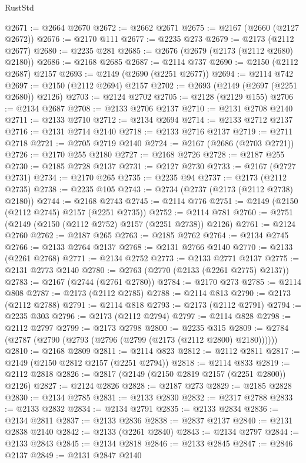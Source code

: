 \begin{lexlean}{RustStd}
\begin{coremodule}
{\begin{coremodule}
{{{{{{{{{{{{{{{{@2671 := @2664 @2670
@2672 := @2662 @2671
@2675 := @2167 (@2660 (@2127 @2672))
@2676 := @2170 @111
@2677 := @2235 @273
@2679 := @2173 (@2112 @2677)
@2680 := @2235 @281
@2685 := @2676 (@2679 (@2173 (@2112 @2680) @2180))
@2686 := @2168 @2685
@2687 := @2114 @737
@2690 := @2150 (@2112 @2687) @2157
@2693 := @2149 (@2690 (@2251 @2677))
@2694 := @2114 @742
@2697 := @2150 (@2112 @2694) @2157
@2702 := @2693 (@2149 (@2697 (@2251 @2680)) @2126)
@2703 := @2124 @2702
@2705 := @2128 (@2129 @155)
@2706 := @2134 @2687
@2708 := @2133 @2706 @2137
@2710 := @2131 @2708 @2140
@2711 := @2133 @2710
@2712 := @2134 @2694
@2714 := @2133 @2712 @2137
@2716 := @2131 @2714 @2140
@2718 := @2133 @2716 @2137
@2719 := @2711 @2718
@2721 := @2705 @2719 @2140
@2724 := @2167 (@2686 (@2703 @2721))
@2726 := @2170 @255 @2180
@2727 := @2168 @2726
@2728 := @2187 @255
@2730 := @2185 @2728 @2137
@2731 := @2127 @2730
@2733 := @2167 (@2727 @2731)
@2734 := @2170 @265
@2735 := @2235 @94
@2737 := @2173 (@2112 @2735)
@2738 := @2235 @105
@2743 := @2734 (@2737 (@2173 (@2112 @2738) @2180))
@2744 := @2168 @2743
@2745 := @2114 @776
@2751 := @2149 (@2150 (@2112 @2745) @2157 (@2251 @2735))
@2752 := @2114 @781
@2760 := @2751 (@2149 (@2150 (@2112 @2752) @2157 (@2251 @2738)) @2126)
@2761 := @2124 @2760
@2762 := @2187 @265
@2763 := @2185 @2762
@2764 := @2134 @2745
@2766 := @2133 @2764 @2137
@2768 := @2131 @2766 @2140
@2770 := @2133 (@2261 @2768)
@2771 := @2134 @2752
@2773 := @2133 @2771 @2137
@2775 := @2131 @2773 @2140
@2780 := @2763 (@2770 (@2133 (@2261 @2775) @2137))
@2783 := @2167 (@2744 (@2761 @2780))
@2784 := @2170 @273
@2785 := @2114 @808
@2787 := @2173 (@2112 @2785)
@2788 := @2114 @813
@2790 := @2173 (@2112 @2788)
@2791 := @2114 @818
@2793 := @2173 (@2112 @2791)
@2794 := @2235 @303
@2796 := @2173 (@2112 @2794)
@2797 := @2114 @828
@2798 := @2112 @2797
@2799 := @2173 @2798
@2800 := @2235 @315
@2809 := @2784 (@2787 (@2790 (@2793 (@2796 (@2799 (@2173 (@2112 @2800) @2180))))))
@2810 := @2168 @2809
@2811 := @2114 @823
@2812 := @2112 @2811
@2817 := @2149 (@2150 @2812 @2157 (@2251 @2794))
@2818 := @2114 @833
@2819 := @2112 @2818
@2826 := @2817 (@2149 (@2150 @2819 @2157 (@2251 @2800)) @2126)
@2827 := @2124 @2826
@2828 := @2187 @273
@2829 := @2185 @2828
@2830 := @2134 @2785
@2831 := @2133 @2830
@2832 := @2317 @2788
@2833 := @2133 @2832
@2834 := @2134 @2791
@2835 := @2133 @2834
@2836 := @2134 @2811
@2837 := @2133 @2836
@2838 := @2837 @2137
@2840 := @2131 @2838 @2140
@2842 := @2133 (@2261 @2840)
@2843 := @2134 @2797
@2844 := @2133 @2843
@2845 := @2134 @2818
@2846 := @2133 @2845
@2847 := @2846 @2137
@2849 := @2131 @2847 @2140
}}}}}}}}}}}}}}}}
\end{coremodule}}
\end{coremodule}
\end{lexlean}
